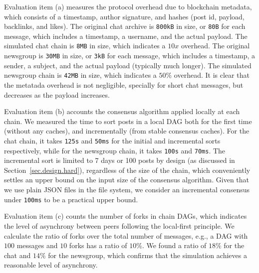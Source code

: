 \documentclass[12pt]{article}
\newcommand{\code}[1]  {\texttt{\footnotesize{#1}}}
\begin{document}
Evaluation item (a) measures the protocol overhead due to blockchain metadata,
which consists of a timestamp, author signature, and hashes (post id, payload,
backlinks, and likes).
%
The original chat archive is \texttt{800kB} in size, or \texttt{80B} for each
message, which includes a timestamp, a username, and the actual payload.
The simulated chat chain is \texttt{8MB} in size, which indicates a $10x$
overhead.
The original newsgroup is \texttt{30MB} in size, or \texttt{3kB} for each
message, which includes a timestamp, a sender, a subject, and the actual
payload (typically much longer).
The simulated newsgroup chain is \texttt{42MB} in size, which indicates a
$50\%$ overhead.
%
It is clear that the metatada overhead is not negligible, specially for short
chat messages, but decreases as the payload increases.

Evaluation item (b) accounts the consensus algorithm applied locally at each
chain.
We measured the time to sort posts in a local DAG both for the first time
(without any caches), and incrementally (from stable consensus caches).
%
For the chat chain, it takes \texttt{125s} and \texttt{50ms} for the initial
and incremental sorts respectively, while for the newsgroup chain, it takes
\texttt{100s} and \texttt{70ms}.
%
%
The incremental sort is limited to 7 days or 100 posts by design (as discussed
in Section~\ref{sec.design.hard}), regardless of the size of the chain, which
conveniently settles an upper bound on the input size of the consensus
algorithm.
%
Given that we use plain JSON files in the file system, we consider an
incremental consensus under \texttt{100ms} to be a practical upper bound.

Evaluation item (c) counts the number of forks in chain DAGs, which indicates
the level of asynchrony between peers following the local-first principle.
We calculate the ratio of forks over the total number of messages, e.g., a DAG
with $100$ messages and $10$ forks has a ratio of $10\%$.
We found a ratio of $18\%$ for the chat and $14\%$ for the newsgroup, which
confirms that the simulation achieves a reasonable level of asynchrony.
\end{document}
